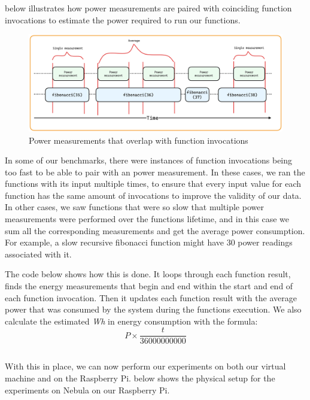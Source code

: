 \documentclass[
  table]{report}
\begin{document}
 below illustrates how power
measurements are paired with coinciding function invocations to estimate
the power required to run our functions.

\begin{figure}[H]
\centering
  \includegraphics{assets/6-power_measurements}
  \caption{Power measurements that overlap with function invocations}
  \label{fig:power_measurement_timeline}
\end{figure}

In some of our benchmarks, there were instances of function invocations
being too fast to be able to pair with an power measurement. In these
cases, we ran the functions with its input multiple times, to ensure
that every input value for each function has the same amount of
invocations to improve the validity of our data. In other cases, we saw
functions that were so slow that multiple power measurements were
performed over the functions lifetime, and in this case we sum all the
corresponding measurements and get the average power consumption. For
example, a slow recursive fibonacci function might have 30 power
readings associated with it.

The code below shows how this is done. It loops through each function
result, finds the energy measurements that begin and end within the
start and end of each function invocation. Then it updates each function
result with the average power that was consumed by the system during the
functions execution. We also calculate the estimated \emph{Wh} in energy
consumption with the formula: \[P \times
\frac{t}{36000000000}\]

\inputminted{rust}{assets/code/pair_power_data.rs}

With this in place, we can now perform our experiments on both our
virtual machine and on the Raspberry Pi.  below
shows the physical setup for the experiments on Nebula on our Raspberry
Pi.
\end{document}

